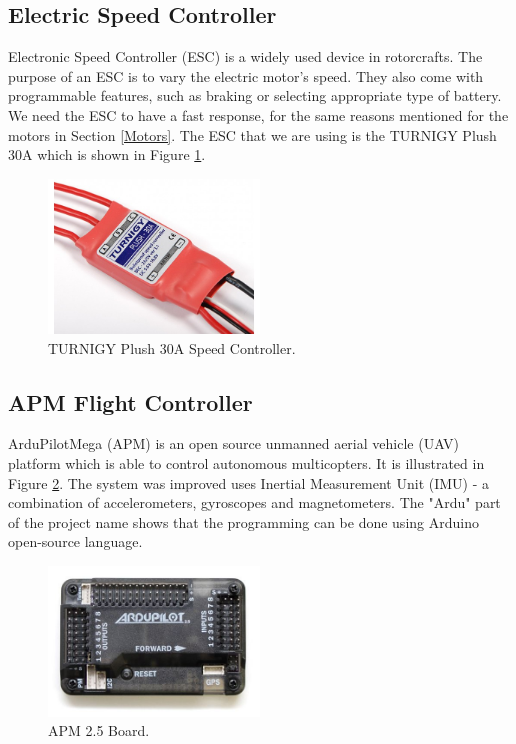 \subsection{Electric Speed Controller}
Electronic Speed Controller (ESC) is a widely used device in rotorcrafts. The purpose of an ESC is to vary the electric motor's speed. They also come with programmable features, such as braking or selecting appropriate type of battery. We need the ESC to have a fast response, for the same reasons mentioned for the motors in Section \ref{Motors}. The ESC that we are using is the TURNIGY Plush 30A which is shown in Figure \ref{esc}.
 
\begin{figure}[H]
  \centering
    \includegraphics[width=0.5\textwidth]{images/esc.jpg}
	\caption{TURNIGY Plush 30A Speed Controller.}
	\label{esc}
\end{figure}

\subsection{APM Flight Controller}
ArduPilotMega (APM) is an open source unmanned aerial vehicle (UAV) platform which is able to control autonomous multicopters. It is illustrated in Figure \ref{ardupilot}. The system was improved uses Inertial Measurement Unit (IMU) - a combination of accelerometers, gyroscopes and magnetometers. The "Ardu" part of the project name shows that the programming can be done using Arduino open-source language.

\begin{figure}[H]
  \centering
    \includegraphics[width=0.5\textwidth]{images/ardupilot.jpg}
	\caption{APM 2.5 Board.}
	\label{ardupilot}
\end{figure}

